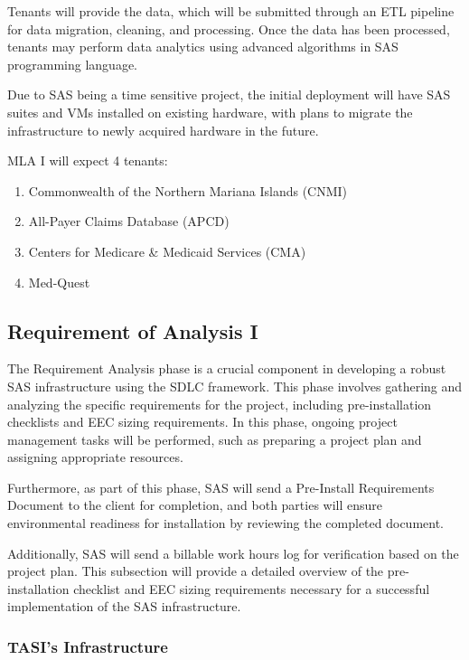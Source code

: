 Tenants will provide the data, which will be submitted through an ETL pipeline for data migration, cleaning, and processing. Once the data has been processed, tenants may perform data analytics using advanced algorithms in SAS programming language.

Due to SAS being a time sensitive project, the initial deployment will have SAS suites and VMs installed on existing hardware, with plans to migrate the infrastructure to newly acquired hardware in the future.

MLA I will expect 4 tenants:
\begin{enumerate}
    \item Commonwealth of the Northern Mariana Islands (CNMI)
    \item All-Payer Claims Database (APCD)
    \item Centers for Medicare \& Medicaid Services (CMA)
    \item Med-Quest
\end{enumerate}

\subsection{Requirement of Analysis I}

The Requirement Analysis phase is a crucial component in developing a robust SAS infrastructure using the SDLC framework. This phase involves gathering and analyzing the specific requirements for the project, including pre-installation checklists and EEC sizing requirements. In this phase, ongoing project management tasks will be performed, such as preparing a project plan and assigning appropriate resources. 

Furthermore, as part of this phase, SAS will send a Pre-Install Requirements Document to the client for completion, and both parties will ensure environmental readiness for installation by reviewing the completed document. 

Additionally, SAS will send a billable work hours log for verification based on the project plan. This subsection will provide a detailed overview of the pre-installation checklist and EEC sizing requirements necessary for a successful implementation of the SAS infrastructure.

\subsubsection{TASI's Infrastructure}
\label{TASI's Infrastructure Section Header}

